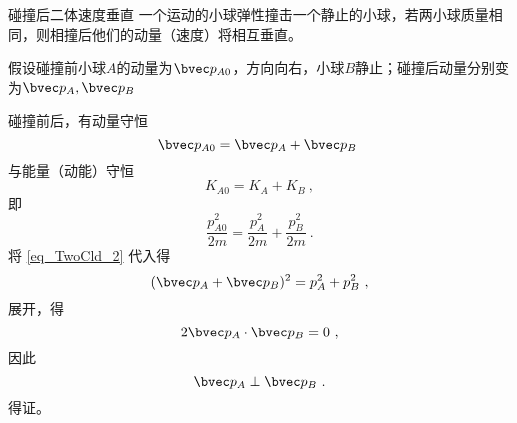 \begin{example}{碰撞后二体速度垂直}
一个运动的小球弹性撞击一个静止的小球，若两小球质量相同，则相撞后他们的动量（速度）将相互垂直。

假设碰撞前小球$A$的动量为$\bvec p_{A0}$，方向向右，小球$B$静止；碰撞后动量分别变为$\bvec p_{A},\bvec p_{B}$

碰撞前后，有动量守恒
\begin{equation}\label{eq_TwoCld_2}
\bvec p_{A0} = \bvec p_{A} + \bvec p_{B}~
\end{equation}
与能量（动能）守恒
\begin{equation}
K_{A0} = K_{A} + K_{B}~,
\end{equation}
即
\begin{equation}
\frac{p_{A0}^2}{2m}=\frac{p_{A}^2}{2m}+\frac{p_{B}^2}{2m}~.
\end{equation}
将 \autoref{eq_TwoCld_2} 代入得
\begin{equation}
(\bvec p_{A} + \bvec p_{B})^2=p_{A}^2+p_{B}^2~,
\end{equation}
展开，得
\begin{equation}
2\bvec p_{A} \cdot \bvec p_{B}=0~,
\end{equation}
因此
\begin{equation}
\bvec p_{A} \perp \bvec p_{B}~.
\end{equation}
得证。
\end{example}



